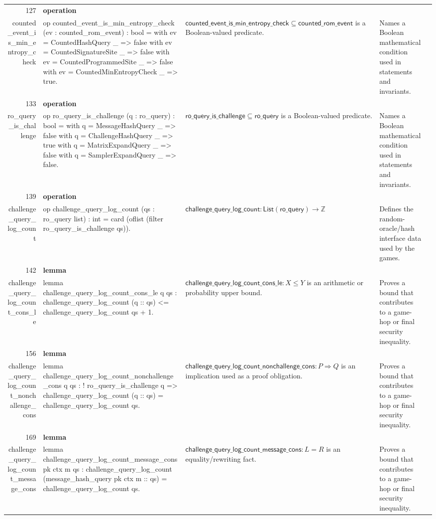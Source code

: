 \documentclass[10pt]{article}
\newcommand{\ec}[1]{\begingroup\ttfamily\scriptsize #1\endgroup}
\begin{document}
\begin{longtable}{r L{0.17\textwidth} L{0.26\textwidth} L{0.27\textwidth} L{0.20\textwidth}}
127 & \textbf{operation}\\\ec{counted\_event\_is\_min\_entropy\_check} & \ec{op counted\_event\_is\_min\_entropy\_check (ev : counted\_rom\_event) : bool = with ev = CountedHashQuery \_ => false with ev = CountedSignatureSite \_ => false with ev = CountedProgrammedSite \_ => false with ev = CountedMinEntropyCheck \_ => true.} & \(\mathsf{counted\_event\_is\_min\_entropy\_check} \subseteq \mathsf{counted\_rom\_event}\) is a Boolean-valued predicate. & Names a Boolean mathematical condition used in statements and invariants. \\
133 & \textbf{operation}\\\ec{ro\_query\_is\_challenge} & \ec{op ro\_query\_is\_challenge (q : ro\_query) : bool = with q = MessageHashQuery \_ => false with q = ChallengeHashQuery \_ => true with q = MatrixExpandQuery \_ => false with q = SamplerExpandQuery \_ => false.} & \(\mathsf{ro\_query\_is\_challenge} \subseteq \mathsf{ro\_query}\) is a Boolean-valued predicate. & Names a Boolean mathematical condition used in statements and invariants. \\
139 & \textbf{operation}\\\ec{challenge\_query\_log\_count} & \ec{op challenge\_query\_log\_count (qs : ro\_query list) : int = card (oflist (filter ro\_query\_is\_challenge qs)).} & \(\mathsf{challenge\_query\_log\_count} : \mathsf{List}(\mathsf{ro\_query}) \to \mathbb{Z}\) & Defines the random-oracle/hash interface data used by the games. \\
142 & \textbf{lemma}\\\ec{challenge\_query\_log\_count\_cons\_le} & \ec{lemma challenge\_query\_log\_count\_cons\_le q qs : challenge\_query\_log\_count (q :: qs) <= challenge\_query\_log\_count qs + 1.} & \(\mathsf{challenge\_query\_log\_count\_cons\_le} : X \le Y\) is an arithmetic or probability upper bound. & Proves a bound that contributes to a game-hop or final security inequality. \\
156 & \textbf{lemma}\\\ec{challenge\_query\_log\_count\_nonchallenge\_cons} & \ec{lemma challenge\_query\_log\_count\_nonchallenge\_cons q qs : ! ro\_query\_is\_challenge q => challenge\_query\_log\_count (q :: qs) = challenge\_query\_log\_count qs.} & \(\mathsf{challenge\_query\_log\_count\_nonchallenge\_cons} : P \Rightarrow Q\) is an implication used as a proof obligation. & Proves a bound that contributes to a game-hop or final security inequality. \\
169 & \textbf{lemma}\\\ec{challenge\_query\_log\_count\_message\_cons} & \ec{lemma challenge\_query\_log\_count\_message\_cons pk ctx m qs : challenge\_query\_log\_count (message\_hash\_query pk ctx m :: qs) = challenge\_query\_log\_count qs.} & \(\mathsf{challenge\_query\_log\_count\_message\_cons} : L = R\) is an equality/rewriting fact. & Proves a bound that contributes to a game-hop or final security inequality. \\

\end{longtable}
\end{document}
